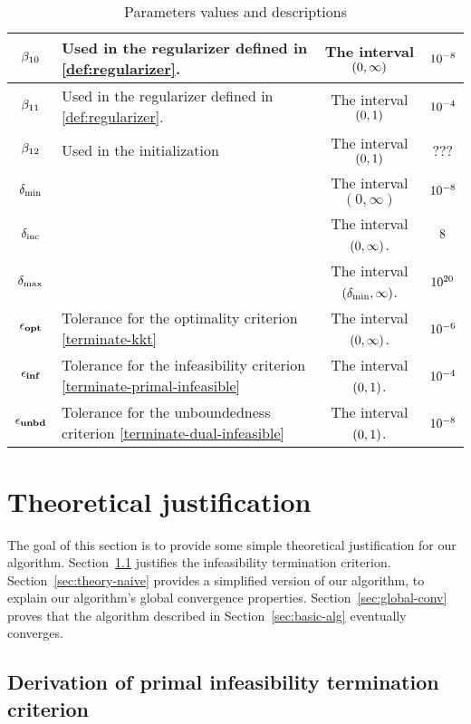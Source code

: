 \documentclass{article}
\begin{document}
\begin{table}[H]
\begin{tabular}{ |c| p{7cm}|c|c| }
\hline
$\beta_{10}$ & Used in the regularizer defined in \eqref{def:regularizer}. & The interval $(0,\infty)$ & $10^{-8}$ \\
\hline
$\beta_{11}$ & Used in the regularizer defined in \eqref{def:regularizer}. & The interval $(0,1)$ & $10^{-4}$ \\
\hline
$\beta_{12}$  & Used in the initialization & The interval $(0,1)$ & ??? \\
\hline
$\delta_{\min}$ &  & The interval $(0,\infty)$ & $10^{-8}$ \\
\hline
$\delta_{\text{inc}}$ & &The interval $(0,\infty)$. & $8$ \\
\hline
$\delta_{\max}$ & &The interval $(\delta_{\min},\infty)$. & $10^{20}$ \\
\hline
$\epsilon_{\textbf{opt}}$ & Tolerance for the optimality criterion \eqref{terminate-kkt} & The interval $(0,\infty)$. & $10^{-6}$  \\
\hline
$\epsilon_{\textbf{inf}}$ & Tolerance for the infeasibility criterion \eqref{terminate-primal-infeasible} & The interval $(0,1)$. & $10^{-4}$ \\
\hline
$\epsilon_{\textbf{unbd}}$ & Tolerance for the unboundedness criterion \eqref{terminate-dual-infeasible} & The interval $(0,1)$. & $10^{-8}$ \\
\hline
\end{tabular}
\caption{Parameters values and descriptions}
\end{table}


\section{Theoretical justification}\label{sec:theory}

The goal of this section is to provide some simple theoretical justification for our algorithm. Section~\ref{sec:infeas-criteron-justify} justifies the infeasibility termination criterion. Section~\ref{sec:theory-naive} provides a simplified version of our algorithm, to explain our algorithm's global convergence properties. Section~\ref{sec:global-conv} proves that the algorithm described in Section~\ref{sec:basic-alg} eventually converges. 

\subsection{Derivation of primal infeasibility termination criterion} \label{sec:infeas-criteron-justify}
\end{document}
